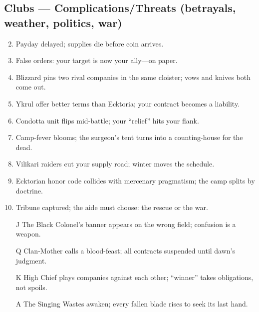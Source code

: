 \subsection*{Clubs --- Complications/Threats (betrayals, weather, politics, war)}
\label{sec:black-banners-complications}
\begin{enumerate}
\setcounter{enumi}{1}
\item Payday delayed; supplies die before coin arrives.
\item False orders: your target is now your ally—on paper.
\item Blizzard pins two rival companies in the same cloister; vows and knives both come out.
\item Ykrul offer better terms than Ecktoria; your contract becomes a liability.
\item Condotta unit flips mid-battle; your “relief” hits your flank.
\item Camp-fever blooms; the surgeon’s tent turns into a counting-house for the dead.
\item Vilikari raiders cut your supply road; winter moves the schedule.
\item Ecktorian honor code collides with mercenary pragmatism; the camp splits by doctrine.
\item Tribune captured; the aide must choose: the rescue or the war.
\item[J] The Black Colonel’s banner appears on the wrong field; confusion is a weapon.
\item[Q] Clan-Mother calls a blood-feast; all contracts suspended until dawn’s judgment.
\item[K] High Chief plays companies against each other; “winner” takes obligations, not spoils.
\item[A] The Singing Wastes awaken; every fallen blade rises to seek its last hand.
\end{enumerate}

